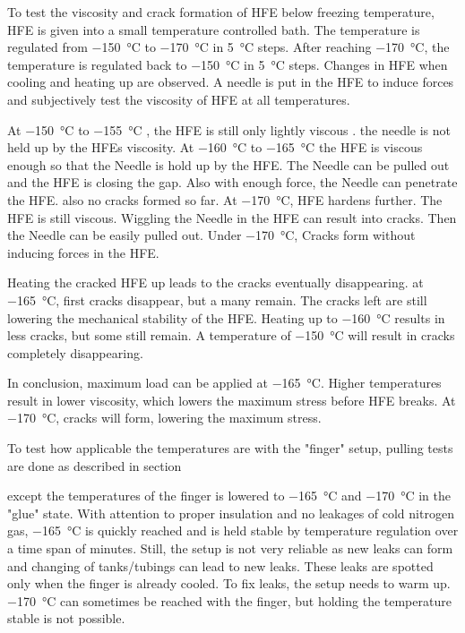 To test the viscosity and crack formation of HFE below freezing temperature, HFE is given into a small temperature controlled bath. The temperature is regulated from \SI{-150}{\degreeCelsius} to \SI{-170}{\degreeCelsius} in \SI{5}{\degreeCelsius} steps. After reaching \SI{-170}{\degreeCelsius}, the temperature is regulated back to \SI{-150}{\degreeCelsius} in \SI{5}{\degreeCelsius} steps. Changes in HFE when cooling and heating up are observed. A needle is put in the HFE to induce forces and subjectively test the viscosity of HFE at all temperatures.

At \SI{-150}{\degreeCelsius} to  \SI{-155}{\degreeCelsius} , the HFE is still only lightly viscous . the needle is not held up by the HFEs viscosity. At \SI{-160}{\degreeCelsius} to  \SI{-165}{\degreeCelsius} the HFE is viscous enough so that the Needle is hold up by the HFE. The Needle can be pulled out and the HFE is closing the gap. Also with enough force, the Needle can penetrate the HFE. also no cracks formed so far. At \SI{-170}{\degreeCelsius}, HFE hardens further. The HFE is still viscous. Wiggling the Needle in the HFE can result into cracks. Then the Needle can be easily pulled out. Under \SI{-170}{\degreeCelsius}, Cracks form without inducing forces in the HFE.

Heating the cracked HFE up leads to the cracks eventually disappearing. at \SI{-165}{\degreeCelsius}, first cracks disappear, but a many remain. The cracks left are still lowering the mechanical stability of the HFE. Heating up to \SI{-160}{\degreeCelsius} results in less cracks, but some still remain. A temperature of \SI{-150}{\degreeCelsius} will result in cracks completely disappearing.

In conclusion, maximum load can be applied at \SI{-165}{\degreeCelsius}. Higher temperatures result in lower viscosity, which lowers the maximum stress before HFE breaks. At \SI{-170}{\degreeCelsius}, cracks will form, lowering the maximum stress.

To test how applicable the temperatures are with the "finger" setup, pulling tests are done as described in section

 except the temperatures of the finger is lowered to \SI{-165}{\degreeCelsius} and \SI{-170}{\degreeCelsius} in the "glue" state. With attention to proper insulation and no leakages of cold nitrogen gas, \SI{-165}{\degreeCelsius} is quickly reached and is held stable by temperature regulation over a time span of minutes. Still, the setup is not very reliable as new leaks can form and changing of tanks/tubings can lead to new leaks. These leaks are spotted only when the finger is already cooled. To fix leaks, the setup needs to warm up. \SI{-170}{\degreeCelsius} can sometimes be reached with the finger, but holding the temperature stable is not possible. 

